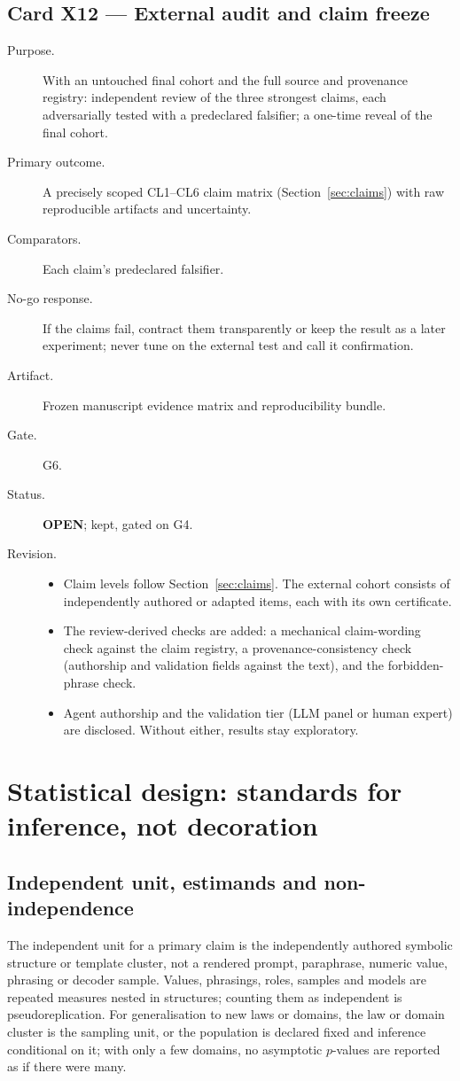 \documentclass[10pt,a4paper]{article}
\begin{document}
\subsection{Card X12 --- External audit and claim freeze}
\label{card:X12}
\begin{description}
\item[Purpose.] With an untouched final cohort and the full source and provenance registry: independent review of
the three strongest claims, each adversarially tested with a predeclared falsifier; a one-time reveal of the final
cohort.
\item[Primary outcome.] A precisely scoped CL1--CL6 claim matrix (Section~\ref{sec:claims}) with raw reproducible artifacts and uncertainty.
\item[Comparators.] Each claim's predeclared falsifier.
\item[No-go response.] If the claims fail, contract them transparently or keep the result as a later experiment;
never tune on the external test and call it confirmation.
\item[Artifact.] Frozen manuscript evidence matrix and reproducibility bundle.
\item[Gate.] G6.
\item[Status.] \textbf{OPEN}; kept, gated on G4.
\item[Revision.]
\begin{itemize}
\item Claim levels follow Section~\ref{sec:claims}. The external cohort consists of independently authored or
adapted items, each with its own certificate.
\item The review-derived checks are added: a mechanical claim-wording check against the claim registry, a
provenance-consistency check (authorship and validation fields against the text), and the forbidden-phrase check.
\item Agent authorship and the validation tier (LLM panel or human expert) are disclosed. Without either, results
stay exploratory.
\end{itemize}
\end{description}

\section{Statistical design: standards for inference, not decoration}
\label{sec:statistics}

\subsection{Independent unit, estimands and non-independence}
The independent unit for a primary claim is the independently authored symbolic structure or template cluster,
not a rendered prompt, paraphrase, numeric value, phrasing or decoder sample. Values, phrasings, roles, samples and
models are repeated measures nested in structures; counting them as independent is pseudoreplication. For
generalisation to new laws or domains, the law or domain cluster is the sampling unit, or the population is
declared fixed and inference conditional on it; with only a few domains, no asymptotic $p$-values are reported as
if there were many.
\end{document}
